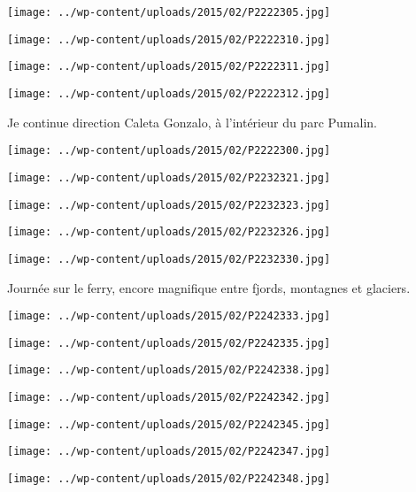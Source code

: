   \newline
\centerline{\texttt{[image: ../wp-content/uploads/2015/02/P2222305.jpg]} } 
 \newline
\centerline{\texttt{[image: ../wp-content/uploads/2015/02/P2222310.jpg]} } 
 \newline
\centerline{\texttt{[image: ../wp-content/uploads/2015/02/P2222311.jpg]} } 
 \newline
\centerline{\texttt{[image: ../wp-content/uploads/2015/02/P2222312.jpg]} } 
Je continue direction Caleta Gonzalo, à l'intérieur du parc Pumalin. \newline
 \newline
\centerline{\texttt{[image: ../wp-content/uploads/2015/02/P2222300.jpg]} } 
 \newline
 \newline
\centerline{\texttt{[image: ../wp-content/uploads/2015/02/P2232321.jpg]} } 
 \newline
\centerline{\texttt{[image: ../wp-content/uploads/2015/02/P2232323.jpg]} } 
 \newline
\centerline{\texttt{[image: ../wp-content/uploads/2015/02/P2232326.jpg]} } 
 \newline
\centerline{\texttt{[image: ../wp-content/uploads/2015/02/P2232330.jpg]} } 
 \newline
 Journée sur le ferry, encore magnifique entre fjords, montagnes et glaciers.\newline
\centerline{\texttt{[image: ../wp-content/uploads/2015/02/P2242333.jpg]} } 
 \newline
 \newline
\centerline{\texttt{[image: ../wp-content/uploads/2015/02/P2242335.jpg]} } 
 \newline
\centerline{\texttt{[image: ../wp-content/uploads/2015/02/P2242338.jpg]} } 
 \newline
\centerline{\texttt{[image: ../wp-content/uploads/2015/02/P2242342.jpg]} } 
 \newline
\centerline{\texttt{[image: ../wp-content/uploads/2015/02/P2242345.jpg]} } 
 \newline
\centerline{\texttt{[image: ../wp-content/uploads/2015/02/P2242347.jpg]} } 
 \newline
\centerline{\texttt{[image: ../wp-content/uploads/2015/02/P2242348.jpg]} } 
